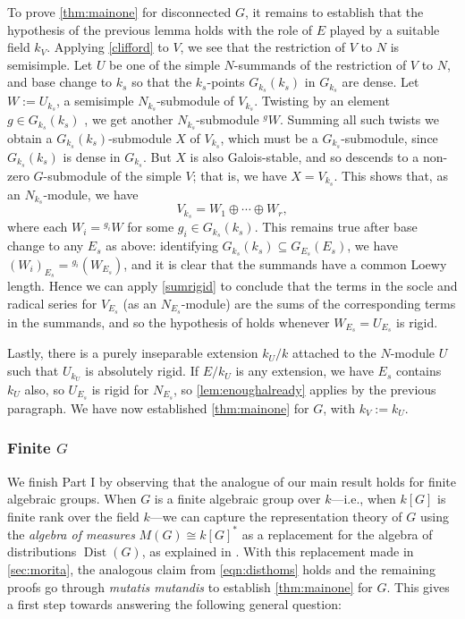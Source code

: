 \documentclass[11pt,reqno]{amsart}
\theoremstyle{definition}
\theoremstyle{remark}
\theoremstyle{definition}
\theoremstyle{plain}
\DeclareMathOperator{\Dist}{Dist}
\begin{document}
To prove \cref{thm:mainone} for disconnected $G$, it remains to establish that the hypothesis of the previous lemma holds with the role of $E$ played by a suitable field $k_V$.
Applying \cref{clifford} to $V$, we see that the restriction of $V$ to $N$ is semisimple.
Let $U$ be one of the simple $N$-summands of the restriction of $V$ to $N$, and base change to $k_s$ so that the $k_s$-points $G_{k_s}(k_s)$ in $G_{k_s}$ are dense.
Let $W := U_{k_s}$, a semisimple $N_{k_s}$-submodule of $V_{k_s}$.
Twisting by an element $g\in G_{k_s}(k_s)$ \cite[I.2.15, I.6.15]{Jan03}, we get another $N_{k_s}$-submodule ${^g}W$.
Summing all such twists we obtain a $G_{k_s}(k_s)$-submodule $X$ of $V_{k_s}$, which must be a $G_{k_s}$-submodule, since $G_{k_s}(k_s)$ is dense in $G_{k_s}$.
But $X$ is also Galois-stable, and so descends to a non-zero $G$-submodule of the simple $V$;
that is, we have $X = V_{k_s}$.
This shows that, as an $N_{k_s}$-module, we have
$$
V_{k_s} = W_1\oplus \cdots \oplus W_r,
$$
where each $W_i = {^{g_i}W}$ for some $g_i\in G_{k_s}(k_s)$.
This remains true after base change to any $E_s$ as above: identifying $G_{k_s}(k_s)\subseteq G_{E_s}(E_s)$, we have $(W_i)_{E_s} = {^{g_i}}(W_{E_s})$, 
and it is clear that the summands have a common Loewy length.
Hence we can apply \cref{sumrigid} to conclude that the terms in the socle and radical series for $V_{E_s}$ (as an $N_{E_s}$-module)
are the sums of the corresponding terms in the summands, and
so the hypothesis of  holds whenever $W_{E_s} = U_{E_s}$ is rigid. 

Lastly, there is a purely inseparable extension $k_U/k$ attached to the $N$-module $U$ such that
$U_{k_U}$ is absolutely rigid.
If $E/k_U$ is any extension, we have $E_s$ contains $k_U$ also, so $U_{E_s}$ is rigid for $N_{E_s}$, so
\cref{lem:enoughalready} applies by the previous paragraph.
We have now established \cref{thm:mainone} for $G$, 
with $k_V:=k_U$.
\subsubsection{Finite \texorpdfstring{$G$}{G}}
We finish Part I by observing that the analogue of our main result holds for finite algebraic groups.
When $G$ is a finite algebraic group over $k$---i.e., when $k[G]$ is finite rank over the field $k$---we can capture the representation theory of $G$ using the \emph{algebra of measures} $M(G)\cong k[G]^*$ as a replacement for the algebra of distributions $\Dist(G)$,
as explained in \cite[I.8]{Jan03}.
With this replacement made in \cref{sec:morita}, the analogous claim from \cref{eqn:disthoms} holds and the remaining proofs go through \emph{mutatis mutandis} to establish \cref{thm:mainone} for $G$.
This gives a first step towards answering the following general question:
\end{document}
